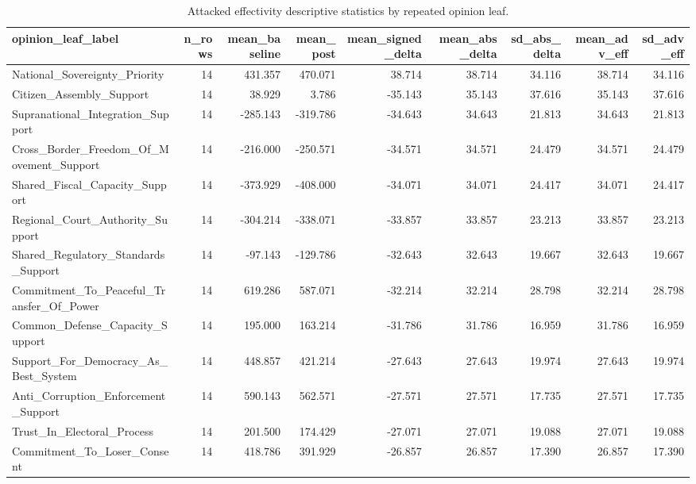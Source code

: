 \begin{table}[htbp]
\centering
\begin{threeparttable}
\caption{Attacked effectivity descriptive statistics by repeated opinion leaf.}
\label{tab:descriptives}
\small
\setlength{\tabcolsep}{4.5pt}
\renewcommand{\arraystretch}{1.10}
\begin{adjustbox}{max width=\linewidth}
\begin{tabular}{lrrrrrrrr}
\toprule
opinion\_leaf\_label & n\_rows & mean\_baseline & mean\_post & mean\_signed\_delta & mean\_abs\_delta & sd\_abs\_delta & mean\_adv\_eff & sd\_adv\_eff \\
\midrule
National\_Sovereignty\_Priority & 14 & 431.357 & 470.071 & 38.714 & 38.714 & 34.116 & 38.714 & 34.116 \\
Citizen\_Assembly\_Support & 14 & 38.929 & 3.786 & -35.143 & 35.143 & 37.616 & 35.143 & 37.616 \\
Supranational\_Integration\_Support & 14 & -285.143 & -319.786 & -34.643 & 34.643 & 21.813 & 34.643 & 21.813 \\
Cross\_Border\_Freedom\_Of\_Movement\_Support & 14 & -216.000 & -250.571 & -34.571 & 34.571 & 24.479 & 34.571 & 24.479 \\
Shared\_Fiscal\_Capacity\_Support & 14 & -373.929 & -408.000 & -34.071 & 34.071 & 24.417 & 34.071 & 24.417 \\
Regional\_Court\_Authority\_Support & 14 & -304.214 & -338.071 & -33.857 & 33.857 & 23.213 & 33.857 & 23.213 \\
Shared\_Regulatory\_Standards\_Support & 14 & -97.143 & -129.786 & -32.643 & 32.643 & 19.667 & 32.643 & 19.667 \\
Commitment\_To\_Peaceful\_Transfer\_Of\_Power & 14 & 619.286 & 587.071 & -32.214 & 32.214 & 28.798 & 32.214 & 28.798 \\
Common\_Defense\_Capacity\_Support & 14 & 195.000 & 163.214 & -31.786 & 31.786 & 16.959 & 31.786 & 16.959 \\
Support\_For\_Democracy\_As\_Best\_System & 14 & 448.857 & 421.214 & -27.643 & 27.643 & 19.974 & 27.643 & 19.974 \\
Anti\_Corruption\_Enforcement\_Support & 14 & 590.143 & 562.571 & -27.571 & 27.571 & 17.735 & 27.571 & 17.735 \\
Trust\_In\_Electoral\_Process & 14 & 201.500 & 174.429 & -27.071 & 27.071 & 19.088 & 27.071 & 19.088 \\
Commitment\_To\_Loser\_Consent & 14 & 418.786 & 391.929 & -26.857 & 26.857 & 17.390 & 26.857 & 17.390 \\

\end{tabular}
\end{adjustbox}
\end{threeparttable}
\end{table}
